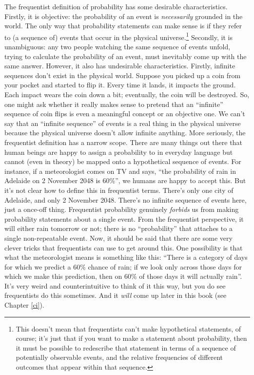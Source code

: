 \documentclass[
]{book}
\theoremstyle{definition}
\theoremstyle{definition}
\theoremstyle{definition}
\theoremstyle{definition}
\theoremstyle{remark}
\begin{document}
The frequentist definition of probability has some desirable characteristics. Firstly, it is objective: the probability of an event is \emph{necessarily} grounded in the world. The only way that probability statements can make sense is if they refer to (a sequence of) events that occur in the physical universe.\footnote{This doesn't mean that frequentists can't make hypothetical statements, of course; it's just that if you want to make a statement about probability, then it must be possible to redescribe that statement in terms of a sequence of potentially observable events, and the relative frequencies of different outcomes that appear within that sequence.} Secondly, it is unambiguous: any two people watching the same sequence of events unfold, trying to calculate the probability of an event, must inevitably come up with the same answer. However, it also has undesirable characteristics. Firstly, infinite sequences don't exist in the physical world. Suppose you picked up a coin from your pocket and started to flip it. Every time it lands, it impacts the ground. Each impact wears the coin down a bit; eventually, the coin will be destroyed. So, one might ask whether it really makes sense to pretend that an ``infinite'' sequence of coin flips is even a meaningful concept or an objective one. We can't say that an ``infinite sequence'' of events is a real thing in the physical universe because the physical universe doesn't allow infinite anything. More seriously, the frequentist definition has a narrow scope. There are many things out there that human beings are happy to assign a probability to in everyday language but cannot (even in theory) be mapped onto a hypothetical sequence of events. For instance, if a meteorologist comes on TV and says, ``the probability of rain in Adelaide on 2 November 2048 is 60\%'', we humans are happy to accept this. But it's not clear how to define this in frequentist terms. There's only one city of Adelaide, and only 2 November 2048. There's no infinite sequence of events here, just a once-off thing. Frequentist probability genuinely \emph{forbids} us from making probability statements about a single event. From the frequentist perspective, it will either rain tomorrow or not; there is no ``probability'' that attaches to a single non-repeatable event. Now, it should be said that there are some very clever tricks that frequentists can use to get around this. One possibility is that what the meteorologist means is something like this: ``There is a category of days for which we predict a 60\% chance of rain; if we look only across those days for which we make this prediction, then on 60\% of those days it will actually rain''. It's very weird and counterintuitive to think of it this way, but you do see frequentists do this sometimes. And it \emph{will} come up later in this book (see Chapter \ref{ci}).
\end{document}
